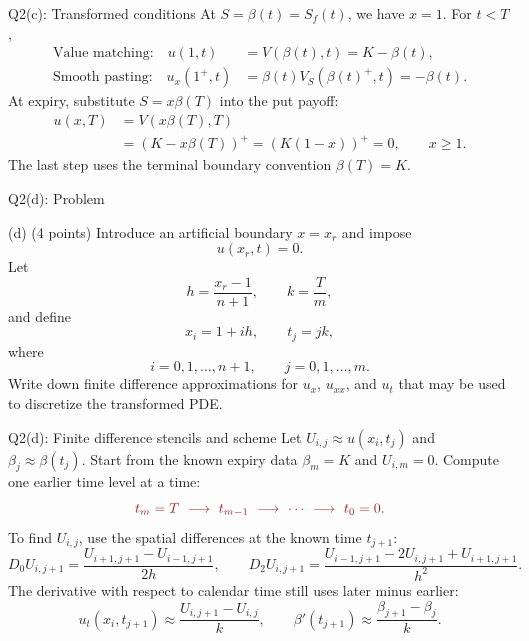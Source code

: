 \documentclass{beamer}
\newcommand{\keymath}[1]{\textcolor{lecturekey}{#1}}
\begin{document}
\begin{frame}{Q2(c): Transformed conditions}
\small
At $S=\beta(t)=S_f(t)$, we have $x=1$. For $t<T$,
\begin{align*}
\text{Value matching:}\quad
u(1,t)&=V(\beta(t),t)=K-\beta(t),\\
\text{Smooth pasting:}\quad
u_x(1^+,t)&=\beta(t)V_S(\beta(t)^+,t)=-\beta(t).
\end{align*}
At expiry, substitute $S=x\beta(T)$ into the put payoff:
\begin{align*}
u(x,T)&=V(x\beta(T),T)\\
      &=(K-x\beta(T))^+=(K(1-x))^+=0,\qquad x\geq1.
\end{align*}
The last step uses the terminal boundary convention $\beta(T)=K$.
\end{frame}

\begin{frame}{Q2(d): Problem}
\footnotesize
\setlength{\abovedisplayskip}{5pt}
\setlength{\belowdisplayskip}{5pt}
\begin{block}{(d) \hfill (4 points)}
Introduce an artificial boundary $x=x_r$ and impose
\[
u(x_r,t)=0.
\]
Let
\[
h=\frac{x_r-1}{n+1},\qquad k=\frac{T}{m},
\]
and define
\[
x_i=1+ih,\qquad t_j=jk,
\]
where
\[
i=0,1,\ldots,n+1,\qquad j=0,1,\ldots,m.
\]
Write down finite difference approximations for $u_x$, $u_{xx}$, and $u_t$ that may be
used to discretize the transformed PDE.
\end{block}
\end{frame}

\begin{frame}{Q2(d): Finite difference stencils and scheme}
\small
Let $U_{i,j}\approx u(x_i,t_j)$ and $\beta_j\approx\beta(t_j)$.
Start from the known expiry data $\beta_m=K$ and $U_{i,m}=0$.
Compute one earlier time level at a time:
\[
\keymath{t_m=T\ \longrightarrow\ t_{m-1}\ \longrightarrow\ \cdots\
\longrightarrow\ t_0=0.}
\]
To find $U_{i,j}$, use the spatial differences at the known time $t_{j+1}$:
\[
D_0U_{i,j+1}=\frac{U_{i+1,j+1}-U_{i-1,j+1}}{2h},
\qquad
D_2U_{i,j+1}=\frac{U_{i-1,j+1}-2U_{i,j+1}+U_{i+1,j+1}}{h^2}.
\]
The derivative with respect to calendar time still uses later minus earlier:
\[
u_t(x_i,t_{j+1})\approx\frac{U_{i,j+1}-U_{i,j}}{k},
\qquad
\beta'(t_{j+1})\approx\frac{\beta_{j+1}-\beta_j}{k}.
\]
\end{frame}
\end{document}
